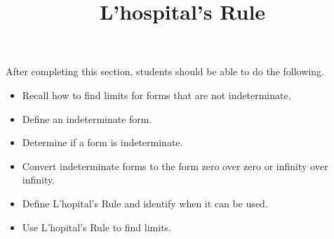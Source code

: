 \documentclass{ximera}
\title{L'hospital's Rule}
\begin{document}
\begin{abstract}
\end{abstract}

\maketitle

\begin{sectionOutcomes}

After completing this section, students should be able to do the following.

\begin{itemize}
	\item Recall how to find limits for forms that are not indeterminate.
	\item Define an indeterminate form.
	\item Determine if a form is indeterminate.
	\item Convert indeterminate forms to the form zero over zero
          or infinity over infinity.
	\item Define L'hopital's Rule and identify when it can be used.
	\item Use L'hopital's Rule to find limits.
\end{itemize}

\end{sectionOutcomes}
\end{document}
